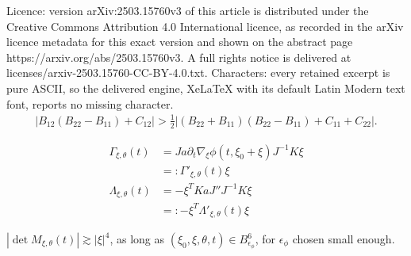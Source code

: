 \documentclass[10pt,a4paper]{amsart}
\newcommand{\Bphi}{B_{\epsilon_\phi}}
\newcommand{\xixi}{\xi_0 + \xi}
\begin{document}
Licence: version arXiv:2503.15760v3 of this article is distributed under the Creative Commons Attribution 4.0 International licence, as recorded in the arXiv licence metadata for this exact version and shown on the abstract page https://arxiv.org/abs/2503.15760v3. A full rights notice is delivered at licenses/arxiv-2503.15760-CC-BY-4.0.txt. Characters: every retained excerpt is pure ASCII, so the delivered engine, XeLaTeX with its default Latin Modern text font, reports no missing character.
    \begin{align}\label{eq: main kakeya open condition}
        |B_{12}(B_{22} - B_{11}) + C_{12}| > \frac{1}{2} |(B_{22} + B_{11})(B_{22} - B_{11}) + C_{11} + C_{22}|.
    \end{align}

\begin{lemma}\label{lem: Gamma Lambda formulas}
    \begin{align}
        \Gamma_{\xi,\theta}(t) &= Ja\partial_t\nabla_\xi \phi(t,\xixi) J^{-1}K \xi \\
        &=: \Gamma'_{\xi,\theta}(t) \xi \\
        \Lambda_{\xi,\theta}(t) &= -\xi^T K a J'' J^{-1} K \xi \\
        &=: -\xi^T \Lambda'_{\xi,\theta}(t) \xi
    \end{align}
\end{lemma}

\begin{claim}\label{claim: twist calculation}
    $|\det M_{\xi,\theta}(t)| \gtrsim |\xi|^4$, as long as $(\xi_0, \xi, \theta, t) \in \Bphi^6$, for $\epsilon_\phi$ chosen small enough. 
\end{claim}
\end{document}
